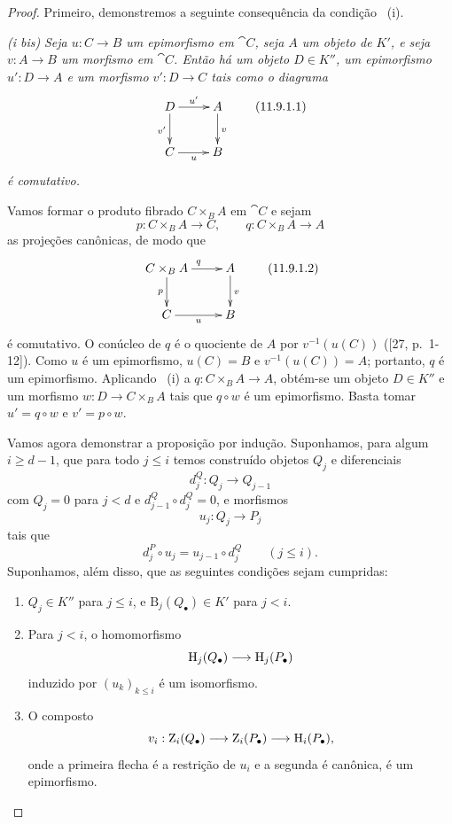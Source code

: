 \begin{proof}
Primeiro, demonstremos a seguinte consequência da condição ~(i).

\medskip\noindent
\emph{(i bis)}
\emph{Seja $u:C\to B$ um epimorfismo em $\cat{C}$, seja $A$ um
objeto de $K'$, e seja $v:A\to B$ um morfismo em $\cat{C}$.
Então há um objeto $D\in K''$, um epimorfismo $u':D\to A$ e um
morfismo $v':D\to C$ tais como o diagrama}
\[
  \xymatrix{
    D\ar[r]^{u'}\ar[d]_{v'} & A\ar[d]^{v}\\
    C\ar[r]_{u} & B
  }
  \tag{11.9.1.1}\label{0.11.9.1.1}
\]
\emph{é comutativo.}

Vamos formar o produto fibrado $C\times_B A$ em $\cat{C}$ e sejam
\[
  p:C\times_B A\longrightarrow C,
  \qquad
  q:C\times_B A\longrightarrow A
\]
as projeções canônicas, de modo que
\[
  \xymatrix{
    C\times_B A\ar[r]^{q}\ar[d]_{p} & A\ar[d]^{v}\\
    C\ar[r]_{u} & B
  }
  \tag{11.9.1.2}\label{0.11.9.1.2}
\]
é comutativo.
O conúcleo de $q$ é o quociente de $A$ por $v^{-1}(u(C))$
([27, p.~1-12]).
Como $u$ é um epimorfismo, $u(C)=B$ e
$v^{-1}(u(C))=A$; portanto, $q$ é um epimorfismo.
Aplicando ~(i) a $q:C\times_B A\to A$, obtém-se um objeto
$D\in K''$ e um morfismo $w:D\to C\times_B A$ tais que $q\circ w$ é
um epimorfismo.
Basta tomar $u'=q\circ w$ e $v'=p\circ w$.

\medskip
Vamos agora demonstrar a proposição por indução.
Suponhamos, para algum $i\geq d-1$, que para todo $j\leq i$ temos
construído objetos $Q_j$ e diferenciais
\[
  d^Q_j:Q_j\longrightarrow Q_{j-1}
\]
com $Q_j=0$ para $j<d$ e
$d^Q_{j-1}\circ d^Q_j=0$, e morfismos
\[
  u_j:Q_j\longrightarrow P_j
\]
tais que
\[
  d^P_j\circ u_j=u_{j-1}\circ d^Q_j
  \qquad(j\leq i).
\]
Suponhamos, além disso, que as seguintes condições sejam cumpridas:
\begin{enumerate}
  \item[$(\mathrm{I}_i)$]
  $Q_j\in K''$ para $j\leq i$, e
  $\mathrm{B}_j(Q_\bullet)\in K'$ para $j<i$.

  \item[$(\mathrm{II}_i)$]
  Para $j<i$, o homomorfismo
  \[
    \mathrm{H}_j(Q_\bullet)\longrightarrow\mathrm{H}_j(P_\bullet)
  \]
  induzido por $(u_k)_{k\leq i}$ é um isomorfismo.

  \item[$(\mathrm{III}_i)$]
  O composto
  \[
    v_i:
    \mathrm{Z}_i(Q_\bullet)
    \longrightarrow
    \mathrm{Z}_i(P_\bullet)
    \longrightarrow
    \mathrm{H}_i(P_\bullet),
  \]
  onde a primeira flecha é a restrição de $u_i$ e a segunda é
  canônica, é um epimorfismo.
\end{enumerate}


\end{proof}
